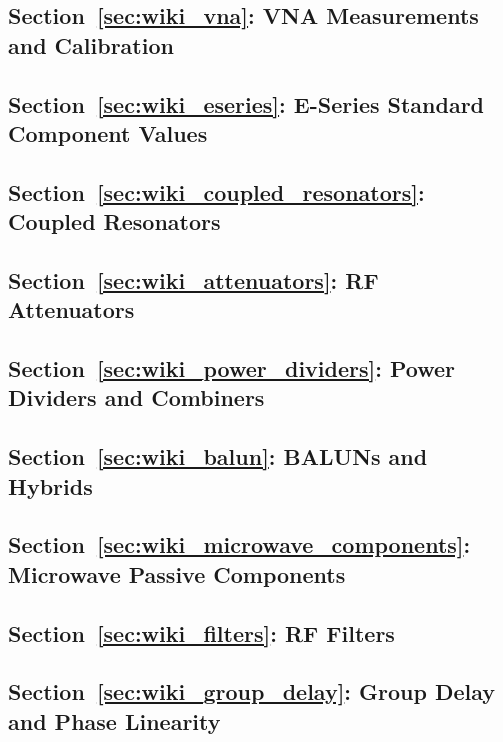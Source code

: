 
\subsection*{Section~\ref{sec:wiki_vna}: VNA Measurements and Calibration}

\subsection*{Section~\ref{sec:wiki_eseries}: E-Series Standard Component Values}

\subsection*{Section~\ref{sec:wiki_coupled_resonators}: Coupled Resonators}

\subsection*{Section~\ref{sec:wiki_attenuators}: RF Attenuators}

\subsection*{Section~\ref{sec:wiki_power_dividers}: Power Dividers and Combiners}

\subsection*{Section~\ref{sec:wiki_balun}: BALUNs and Hybrids}

\subsection*{Section~\ref{sec:wiki_microwave_components}: Microwave Passive Components}

\subsection*{Section~\ref{sec:wiki_filters}: RF Filters}

\subsection*{Section~\ref{sec:wiki_group_delay}: Group Delay and Phase Linearity}
